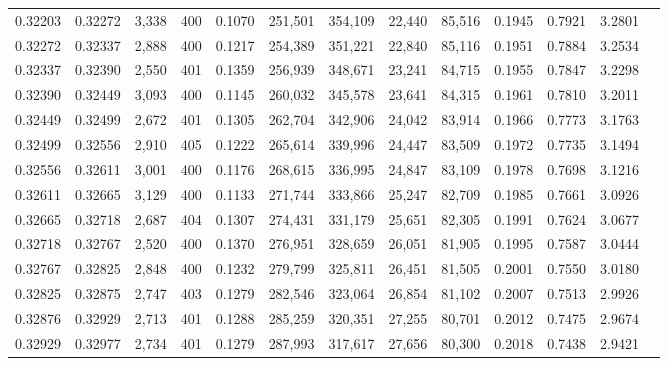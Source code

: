 \begin{tabular}{rrrrrrrrrrrrr}
0.32203 & 0.32272 &  3,338 & 400 &                                     0.1070 & 251,501 & 354,109 &  22,440 &  85,516 & 0.1945 & 0.7921 & 3.2801 \\
0.32272 & 0.32337 &  2,888 & 400 &                                     0.1217 & 254,389 & 351,221 &  22,840 &  85,116 & 0.1951 & 0.7884 & 3.2534 \\
0.32337 & 0.32390 &  2,550 & 401 &                                     0.1359 & 256,939 & 348,671 &  23,241 &  84,715 & 0.1955 & 0.7847 & 3.2298 \\
0.32390 & 0.32449 &  3,093 & 400 &                                     0.1145 & 260,032 & 345,578 &  23,641 &  84,315 & 0.1961 & 0.7810 & 3.2011 \\
0.32449 & 0.32499 &  2,672 & 401 &                                     0.1305 & 262,704 & 342,906 &  24,042 &  83,914 & 0.1966 & 0.7773 & 3.1763 \\
0.32499 & 0.32556 &  2,910 & 405 &                                     0.1222 & 265,614 & 339,996 &  24,447 &  83,509 & 0.1972 & 0.7735 & 3.1494 \\
0.32556 & 0.32611 &  3,001 & 400 &                                     0.1176 & 268,615 & 336,995 &  24,847 &  83,109 & 0.1978 & 0.7698 & 3.1216 \\
0.32611 & 0.32665 &  3,129 & 400 &                                     0.1133 & 271,744 & 333,866 &  25,247 &  82,709 & 0.1985 & 0.7661 & 3.0926 \\
0.32665 & 0.32718 &  2,687 & 404 &                                     0.1307 & 274,431 & 331,179 &  25,651 &  82,305 & 0.1991 & 0.7624 & 3.0677 \\
0.32718 & 0.32767 &  2,520 & 400 &                                     0.1370 & 276,951 & 328,659 &  26,051 &  81,905 & 0.1995 & 0.7587 & 3.0444 \\
0.32767 & 0.32825 &  2,848 & 400 &                                     0.1232 & 279,799 & 325,811 &  26,451 &  81,505 & 0.2001 & 0.7550 & 3.0180 \\
0.32825 & 0.32875 &  2,747 & 403 &                                     0.1279 & 282,546 & 323,064 &  26,854 &  81,102 & 0.2007 & 0.7513 & 2.9926 \\
0.32876 & 0.32929 &  2,713 & 401 &                                     0.1288 & 285,259 & 320,351 &  27,255 &  80,701 & 0.2012 & 0.7475 & 2.9674 \\
0.32929 & 0.32977 &  2,734 & 401 &                                     0.1279 & 287,993 & 317,617 &  27,656 &  80,300 & 0.2018 & 0.7438 & 2.9421 \\

\end{tabular}
